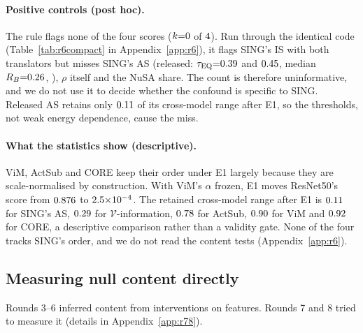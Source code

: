 \documentclass[10pt]{article}
\begin{document}
\paragraph{Positive controls (post hoc).}
The rule flags none of the four scores ($k{=}0$ of $4$). Run through the identical code (Table~\ref{tab:r6compact} in Appendix~\ref{app:r6}), it flags SING's IS with both translators but misses SING's AS (released: $\tau_{\mathrm{EQ}}{=}0.39$ and $0.45$, median $R_B{=}0.26$, \RPASrelVerdict), $\rho$ itself and the NuSA share. The count is therefore uninformative, and we do not use it to decide whether the confound is specific to SING. Released AS retains only $0.11$ of its cross-model range after E1, so the thresholds, not weak energy dependence, cause the miss.

\paragraph{What the statistics show (descriptive).}
ViM, ActSub and CORE keep their order under E1 largely because they are scale-normalised by construction. With ViM's $\alpha$ frozen, E1 moves ResNet50's score from $0.876$ to $2.5{\times}10^{-4}$. The retained cross-model range after E1 is $0.11$ for SING's AS, $0.29$ for $\mathcal{V}$-information, $0.78$ for ActSub, $0.90$ for ViM and $0.92$ for CORE, a descriptive comparison rather than a validity gate. None of the four tracks SING's order, and we do not read the content tests (Appendix~\ref{app:r6}).

\subsection{Measuring null content directly}
\label{sec:content}
Rounds 3--6 inferred content from interventions on features. Rounds 7 and 8 tried to measure it (details in Appendix~\ref{app:r78}).
\end{document}
